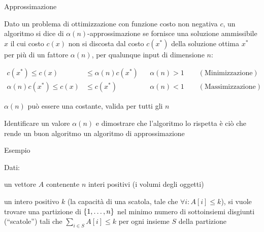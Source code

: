 \begin{frame}{Approssimazione}

\vspace{-9pt}
\begin{myboxtitle}[Definizione]
Dato un problema di ottimizzazione con funzione costo non negativa $c$,
un algoritmo si dice di \alert{$\alpha(n)$-approssimazione} se fornisce una soluzione ammissibile $x$ il cui costo $c(x)$ non si discosta dal costo $c(x^*)$ della soluzione ottima $x^*$ per più di un fattore $\alpha(n)$,
per qualunque input di dimensione $n$:

\begin{align*}
c(x^*) \leq c(x) & \leq \alpha(n) c(x^*)  && \alpha(n) > 1 \qquad (\textrm{Minimizzazione})\\
\alpha(n) c(x^*) \leq c(x) & \leq c(x^*)  && \alpha(n) < 1 \qquad (\textrm{Massimizzazione})
\end{align*}
\end{myboxtitle}

\BIL
\item $\alpha(n)$ può essere una costante, valida per tutti gli $n$
\item Identificare un valore $\alpha(n)$ e dimostrare che l'algoritmo lo rispetta è ciò che rende un buon algoritmo un algoritmo di approssimazione
\EIL


\end{frame}


\begin{frame}{Esempio}

\vspace{-9pt}
\begin{myboxtitle}
Dati:
\BI
\item un vettore $A$ contenente $n$ interi positivi (i \alert{volumi}
degli \alert{oggetti}) 
\item un intero positivo $k$ (la \alert{capacità} di una \alert{scatola}, tale che $\forall i: A[i] \leq k$), 
\EI
si vuole trovare una partizione di $\{1, \ldots, n\}$ nel minimo numero di sottoinsiemi disgiunti (``scatole'') tali che $\sum_{i\in S} A[i] \le k$ per ogni insieme $S$ della partizione
\end{myboxtitle}

\vspace{-9pt}

\end{frame}

